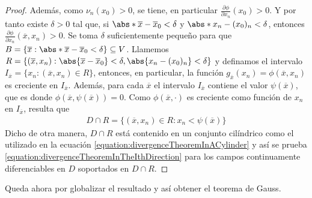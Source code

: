 \documentclass{report}
\theoremstyle{remark}
\begin{document}
\begin{proof}
    Además, como \(\nu_n(x_0) > 0\), se tiene, en particular \(\frac{\partial \phi}{\partial x_n}(x_0) > 0\).
    Y por tanto existe \(\delta > 0\) tal que, si \(\abs*{\overline{x} - \overline{x}_0} < \delta\) y \(\abs*{x_n - (x_0)_n} < \delta\),
    entonces \(\frac{\partial \phi}{\partial x_n}(\overline{x}, x_n) > 0\).
    Se toma \(\delta\) suficientemente pequeño para que \(B = \{\overline{x} : \abs*{\overline{x} - \overline{x}_0} < \delta\} \subseteq V\).
    Llamemos \(R = \{
      (\overline{x}, x_n) :
      \abs{\overline{x} - \overline{x}_0} < \delta,
      \abs{x_n - (x_0)_n} < \delta
    \}\)
    y definamos el intervalo \(I_{\overline{x}} = \{x_n : (\overline{x}, x_n) \in R\}\), entonces, en particular, la función \(g_{\overline{x}}(x_n) = \phi(\overline{x}, x_n)\) es creciente en \(I_{\overline{x}}\).
    Además, para cada \(\overline{x}\) el intervalo \(I_{\overline{x}}\) 
    contiene el valor \(\psi(\overline{x})\), que es donde \(\phi(\overline{x}, \psi(\overline{x})) = 0\).
    Como \(\phi(\overline{x}, \cdot)\) es creciente como función de \(x_n\) en \(I_{\overline{x}}\), resulta que
    \begin{align}
      D \cap R
      =
      \{(\overline{x}, x_n) \in R : x_n < \psi(\overline{x})\}
    \end{align}
    Dicho de otra manera, \(D \cap R\) está contenido en un conjunto cilíndrico como el utilizado en la ecuación \eqref{equation:divergenceTheoremInACylinder} y así se prueba \eqref{equation:divergenceTheoremInTheIthDirection} para los campos continuamente diferenciables en \(D\) soportados en \(D \cap R\).
  \end{proof}


  \newpage
  Queda ahora por globalizar el resultado y así obtener el teorema de Gauss.
\end{document}
